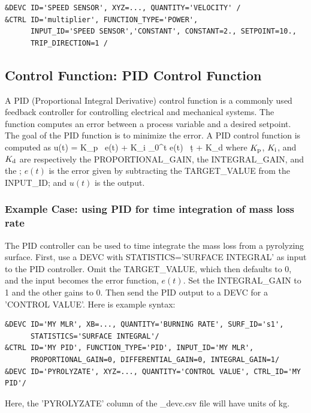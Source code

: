 \documentclass[11pt]{book}
\begin{document}
\begin{lstlisting}
&DEVC ID='SPEED SENSOR', XYZ=..., QUANTITY='VELOCITY' /
&CTRL ID='multiplier', FUNCTION_TYPE='POWER',
      INPUT_ID='SPEED SENSOR','CONSTANT', CONSTANT=2., SETPOINT=10.,
      TRIP_DIRECTION=1 /
\end{lstlisting}


\subsection{Control Function: PID Control Function}
\label{info:CONTROL_PID}

A PID (Proportional Integral Derivative) control function is a commonly used feedback controller for controlling electrical and mechanical systems.  The function computes an error between a process variable and a desired setpoint.  The goal of the PID function is to minimize the error.  A PID control function is computed as
\be u(t) \; = \; K_{\rm p} \, e(t) \; + \; \; K_{\rm i} \int_0^t \! e(t) \, \d t   \; + \; K_{\rm d} \ee
where $K_{\rm p}$, $K_{\rm i}$, and $K_{\rm d}$ are respectively the {\ct PROPORTIONAL\_GAIN}, the {\ct INTEGRAL\_GAIN}, and the
; $e(t)$ is the error given by subtracting the {\ct TARGET\_VALUE} from the {\ct INPUT\_ID}; and $u(t)$ is the output.


\subsubsection{Example Case: using PID for time integration of mass loss rate }
\label{sec:pidintmlr}

The PID controller can be used to time integrate the mass loss from a pyrolyzing surface.  First, use a {\ct DEVC} with {\ct STATISTICS='SURFACE INTEGRAL'} as input to the PID controller.  Omit the {\ct TARGET\_VALUE}, which then defaults to 0, and the input becomes the error function, $e(t)$.  Set the {\ct INTEGRAL\_GAIN} to 1 and the other gains to 0.  Then send the PID output to a {\ct DEVC} for a {\ct 'CONTROL VALUE'}.  Here is example syntax:
\begin{lstlisting}
&DEVC ID='MY MLR', XB=..., QUANTITY='BURNING RATE', SURF_ID='s1',
      STATISTICS='SURFACE INTEGRAL'/
&CTRL ID='MY PID', FUNCTION_TYPE='PID', INPUT_ID='MY MLR',
      PROPORTIONAL_GAIN=0, DIFFERENTIAL_GAIN=0, INTEGRAL_GAIN=1/
&DEVC ID='PYROLYZATE', XYZ=..., QUANTITY='CONTROL VALUE', CTRL_ID='MY PID'/
\end{lstlisting}
Here, the {\ct 'PYROLYZATE'} column of the {\ct \_devc.csv} file will have units of \si{kg}.
\end{document}
